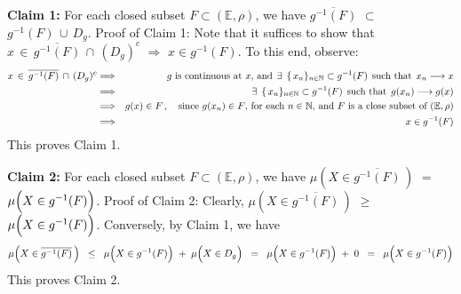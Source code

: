 \vskip 0.5cm
\noindent
\textbf{Claim 1:}\;\;
For each closed subset $F \subset (\mathbb{E},\rho)$, we have\;
$\overline{g^{-1}(F)}$ \;$\subset$\; $g^{-1}(F)\,\cup\,D_{g}$.
\vskip 0.1cm
\noindent
Proof of Claim 1:\;\;
Note that it suffices to show that \;$x \,\in\, \overline{g^{-1}(F)} \,\cap\, (D_{g})^{c}$ \;$\Longrightarrow$\; $x \in g^{-1}(F)$.
To this end, observe:
\begin{eqnarray*}
x \,\in\, \overline{g^{-1}(F)} \,\cap\, (D_{g})^{c}
&\Longrightarrow&
	\textnormal{$g$ is continuous at $x$, and}\;\,
	\exists\;\, \{\,x_{n}\}_{n\in\mathbb{N}} \subset g^{-1}(F)\;\, \textnormal{such that}\;\, x_{n} \longrightarrow x
\\
&\Longrightarrow&
	\exists\;\, \{\,x_{n}\}_{n\in\mathbb{N}} \subset g^{-1}(F)\;\, \textnormal{such that}\;\, g(x_{n}) \longrightarrow g(x)
\\
&\Longrightarrow&
	g(x) \in F\,, \quad\textnormal{since $g(x_{n}) \in F$, for each $n\in\mathbb{N}$, and $F$ is a close subset of $(\mathbb{E},\rho)$}
\\
&\Longrightarrow&
	x \in g^{-1}(F)
\end{eqnarray*}
This proves Claim 1.

\vskip 0.5cm
\noindent
\textbf{Claim 2:}\;\;
For each closed subset $F \subset (\mathbb{E},\rho)$, we have\;
$\mu\!\left(X\in\overline{g^{-1}(F)}\,\right)$ \;$=$\;
$\mu\!\left(X\overset{{\color{white}.}}{\in} g^{-1}(F)\right)$.
\vskip 0.1cm
\noindent
Proof of Claim 2:\;\;
Clearly, 
$\mu\!\left(X\in\overline{g^{-1}(F)}\,\right)$ \;$\geq$\;
$\mu\!\left(X\overset{{\color{white}.}}{\in} g^{-1}(F)\right)$.
Conversely, by Claim 1, we have
\begin{equation*}
\mu\!\left(X\in\overline{g^{-1}(F)}\,\right)
\;\;\leq\;\;
	\mu\!\left(X\overset{{\color{white}.}}{\in} g^{-1}(F)\right)
	\; + \;
	\mu\!\left(X\overset{{\color{white}.}}{\in} D_{g}\right)
\;\;=\;\;
	\mu\!\left(X\overset{{\color{white}.}}{\in} g^{-1}(F)\right)
	\; + \;
	0
\;\;=\;\;
	\mu\!\left(X\overset{{\color{white}.}}{\in} g^{-1}(F)\right)
\end{equation*}
This proves Claim 2.

